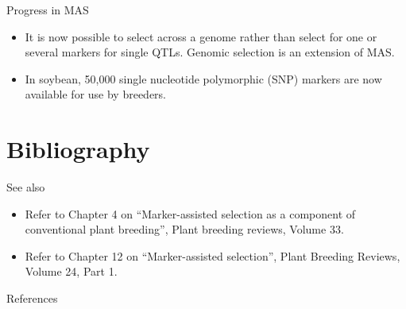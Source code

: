 \documentclass[11pt,dvipsnames,ignorenonframetext,aspectratio=169]{beamer}
\newif\ifbibliography
\providecommand{\tightlist}{%
  \setlength{\itemsep}{0pt}\setlength{\parskip}{0pt}}
\begin{document}
\begin{frame}{Progress in MAS}
\protect\hypertarget{progress-in-mas}{}
\begin{itemize}
\tightlist
\item
  It is now possible to select across a genome rather than select for
  one or several markers for single QTLs. Genomic selection is an
  extension of MAS.
\item
  In soybean, 50,000 single nucleotide polymorphic (SNP) markers are now
  available for use by breeders.
\end{itemize}
\end{frame}

\hypertarget{bibliography}{%
\section{Bibliography}\label{bibliography}}

\begin{frame}{See also}
\protect\hypertarget{see-also}{}
\begin{itemize}
\tightlist
\item
  Refer to Chapter 4 on ``Marker-assisted selection as a component of
  conventional plant breeding'', Plant breeding reviews, Volume 33.
\item
  Refer to Chapter 12 on ``Marker-assisted selection'', Plant Breeding
  Reviews, Volume 24, Part 1.
\end{itemize}
\end{frame}

\begin{frame}{References}
\protect\hypertarget{references}{}
\end{frame}

          \begin{frame}[allowframebreaks]{}
    \bibliographytrue
    
    \end{frame}
  
\end{document}
